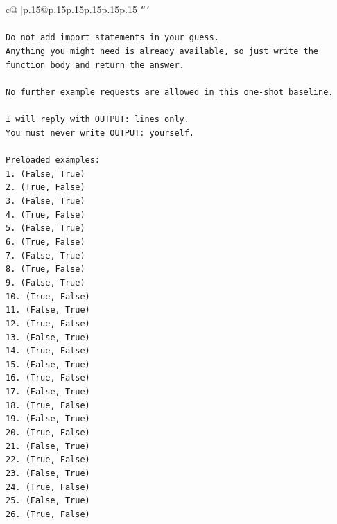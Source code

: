 \documentclass{article}
\begin{document}
{\begin{supertabular}{c@{$\;$}|p{.15\linewidth}@{}p{.15\linewidth}p{.15\linewidth}p{.15\linewidth}p{.15\linewidth}p{.15\linewidth}}
{{{\texttt{```} \\
\\ 
\texttt{Do not add import statements in your guess.} \\
\texttt{Anything you might need is already available, so just write the function body and return the answer.} \\
\\ 
\texttt{No further example requests are allowed in this one{-}shot baseline.} \\
\\ 
\texttt{I will reply with OUTPUT: lines only.} \\
\texttt{You must never write OUTPUT: yourself.} \\
\\ 
\texttt{Preloaded examples:} \\
\texttt{1. (False, True)} \\
\texttt{2. (True, False)} \\
\texttt{3. (False, True)} \\
\texttt{4. (True, False)} \\
\texttt{5. (False, True)} \\
\texttt{6. (True, False)} \\
\texttt{7. (False, True)} \\
\texttt{8. (True, False)} \\
\texttt{9. (False, True)} \\
\texttt{10. (True, False)} \\
\texttt{11. (False, True)} \\
\texttt{12. (True, False)} \\
\texttt{13. (False, True)} \\
\texttt{14. (True, False)} \\
\texttt{15. (False, True)} \\
\texttt{16. (True, False)} \\
\texttt{17. (False, True)} \\
\texttt{18. (True, False)} \\
\texttt{19. (False, True)} \\
\texttt{20. (True, False)} \\
\texttt{21. (False, True)} \\
\texttt{22. (True, False)} \\
\texttt{23. (False, True)} \\
\texttt{24. (True, False)} \\
\texttt{25. (False, True)} \\
\texttt{26. (True, False)} \\
}}}
\end{supertabular}}
\end{document}
